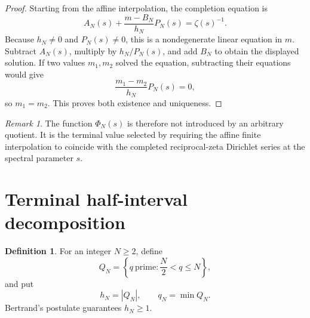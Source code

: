 \documentclass[11pt]{amsart}
\numberwithin{equation}{section}
\theoremstyle{plain}
\theoremstyle{definition}
\newtheorem{definition}[theorem]{Definition}
\theoremstyle{remark}
\newtheorem{remark}[theorem]{Remark}
\newcommand{\1}{\mathbf{1}}
\begin{document}
\begin{proof}
Starting from the affine interpolation, the completion equation is
\begin{equation}
A_N(s)+\frac{m-B_N}{h_N}P_N(s)
=
\zeta(s)^{-1}.
\label{eq:completion_equation_expanded}
\end{equation}
Because \(h_N\neq0\) and \(P_N(s)\neq0\), this is a nondegenerate linear
equation in \(m\).  Subtract \(A_N(s)\), multiply by \(h_N/P_N(s)\), and
add \(B_N\) to obtain the displayed solution.  If two values \(m_1,m_2\)
solved the equation, subtracting their equations would give
\begin{equation}
\frac{m_1-m_2}{h_N}P_N(s)=0,
\label{eq:completion_uniqueness}
\end{equation}
so \(m_1=m_2\).  This proves both existence and uniqueness.
\end{proof}

\begin{remark}
\label{rem:Phi_meaning}
The function \(\Phi_N(s)\) is therefore not introduced by an arbitrary
quotient.  It is the terminal value selected by requiring the affine finite
interpolation to coincide with the completed reciprocal-zeta Dirichlet
series at the spectral parameter \(s\).
\end{remark}

\section{Terminal half-interval decomposition}
\label{sec:mobius_definitions}

\begin{definition}
\label{def:terminal_prime_set}
For an integer \(N\geq 2\), define
\begin{equation}
Q_N
=
\left\{
q\ \text{prime}:\frac{N}{2}<q\leq N
\right\},
\label{eq:terminal_prime_set}
\end{equation}
and put
\begin{equation}
h_N=|Q_N|,
\qquad
q_N=\min Q_N.
\label{eq:hN_qN}
\end{equation}
Bertrand's postulate guarantees \(h_N\geq 1\).
\end{definition}
\end{document}
